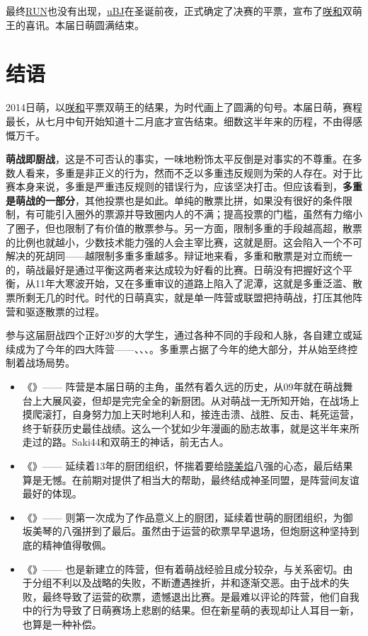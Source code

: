 最终\uline{RUN}也没有出现，\uline{uBJ}在圣诞前夜，正式确定了决赛的平票，宣布了\uline{咲}\uline{和}双萌王的喜讯。本届日萌圆满结束。

\chapter{结语}

2014日萌，以\uline{咲}\uline{和}平票双萌王的结果，为时代画上了圆满的句号。本届日萌，赛程最长，从七月中旬开始知道十二月底才宣告结束。细数这半年来的历程，不由得感慨万千。

\textbf{萌战即厨战}，这是不可否认的事实，一味地粉饰太平反倒是对事实的不尊重。在多数人看来，多重是非正义的行为，然而不乏以多重违反规则为荣的人存在。对于比赛本身来说，多重是严重违反规则的错误行为，应该坚决打击。但应该看到，\textbf{多重是萌战的一部分}，其他投票也是如此。单纯的散票比拼，如果没有很好的条件限制，有可能引入圈外的票源并导致圈内人的不满；提高投票的门槛，虽然有力缩小了圈子，但也限制了有价值的散票参与。另一方面，限制多重的手段越高超，散票的比例也就越小，少数技术能力强的人会主宰比赛，这就是厨。这会陷入一个不可解决的死胡同——越限制多重多重越多。辩证地来看，多重和散票是对立而统一的，萌战最好是通过平衡这两者来达成较为好看的比赛。日萌没有把握好这个平衡，从11年大寒波开始，又在多重审议的道路上陷入了泥潭，这就是多重泛滥、散票所剩无几的时代。时代的日萌真实，就是单一阵营或联盟把持萌战，打压其他阵营和驱逐散票的过程。

参与这届厨战四个正好20岁的大学生，通过各种不同的手段和人脉，各自建立或延续成为了今年的四大阵营——、、、。多重票占据了今年的绝大部分，并从始至终控制着战场局势。

\begin{itemize}
\item 《》——
阵营是本届日萌的主角，虽然有着久远的历史，从09年就在萌战舞台上大展风姿，但却是完完全全的新厨团。从对萌战一无所知开始，在战场上摸爬滚打，自身努力加上天时地利人和，接连击溃、战胜、反击、耗死运营，终于斩获历史最佳战绩。这么一个犹如少年漫画的励志故事，就是这半年来所走过的路。Saki44和双萌王的神话，前无古人。
\item 《》——
延续着13年的厨团组织，怀揣着要给\uline{晓美焰}八强的心态，最后结果算是无憾。在前期对提供了相当大的帮助，最终结成神圣同盟，是阵营间友谊最好的体现。
\item 《》——
则第一次成为了作品意义上的厨团，延续着世萌的厨团组织，为御坂美琴的八强拼到了最后。虽然由于运营的砍票早早退场，但炮厨这种坚持到底的精神值得敬佩。
\item 《》——
也是新建立的阵营，但有着萌战经验且成分较杂，与关系密切。由于分组不利以及战略的失败，不断遭遇挫折，并和逐渐交恶。由于战术的失败，最终导致了运营的砍票，遗憾退出比赛。是最难以评论的阵营，他们自我中的行为导致了日萌赛场上悲剧的结果。但在新星萌的表现却让人耳目一新，也算是一种补偿。
\end{itemize}

